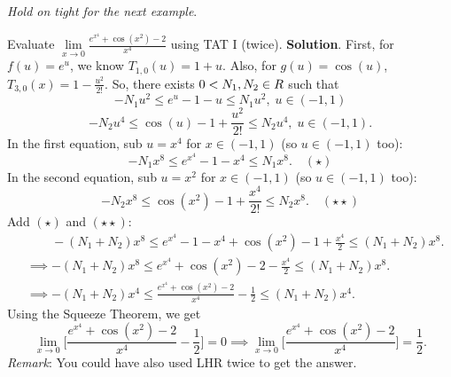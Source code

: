 \emph{Hold on tight for the next example}.
\begin{Example}{}{}
    Evaluate $ \displaystyle \lim\limits_{{x} \to {0}}\frac{e^{x^4}+\cos (x^2)-2}{x^4} $ using TAT I (twice).
    \tcblower{}
    \textbf{Solution}. First, for $ f(u)=e^u $, we know $ T_{1,0}(u)=1+u $. Also, for $ g(u)=\cos(u) $,
    $ T_{3,0}(x)=1-\frac{u^2}{2!} $. So, there exists $ 0<N_1,N_2\in\relax{R} $ such that
    \[ -N_1 u^2\le e^{u}-1-u\le N_1 u^2, \; u\in(-1,1) \]
    \[ -N_2 u^4\le \cos(u)-1+\frac{u^2}{2!}\le N_2 u^4,\; u\in(-1,1). \]
    In the first equation, sub $ u=x^4 $ for $ x\in(-1,1) $ (so $ u\in(-1,1) $ too):
    \[ -N_1 x^8\le e^{x^4}-1-x^4\le N_1 x^8.\quad(\star) \]
    In the second equation, sub $ u=x^2 $ for $ x\in(-1,1) $ (so $ u\in(-1,1) $ too):
    \[ -N_2 x^8\le \cos(x^2)-1+\frac{x^4}{2!}\le N_2 x^8.\quad(\star\star) \]
    Add $ (\star) $ and $ (\star\star) $:
    \begin{align*}
         & \phantom{\implies}-(N_1+N_2)x^8\le e^{x^4}-1-x^4+\cos(x^2)-1+\frac{x^4}{2}\le (N_1+N_2)x^8. \\
         & \implies -(N_1+N_2)x^8\le e^{x^4}+\cos(x^2)-2-\frac{x^4}{2}\le (N_1+N_2)x^8.                \\
         & \implies -(N_1+N_2)x^4\le \frac{e^{x^4}+\cos(x^2)-2}{x^4}-\frac{1}{2}\le (N_1+N_2)x^4.
    \end{align*}
    Using the Squeeze Theorem, we get
    \[ \lim\limits_{{x} \to {0}}\biggl[\frac{e^{x^4}+\cos(x^2)-2}{x^4}-\frac{1}{2}\biggr]=0\implies
        \lim\limits_{{x} \to {0}}\biggl[\frac{e^{x^4}+\cos(x^2)-2}{x^4}\biggr]=\frac{1}{2}. \]
    \emph{Remark}: You could have also used LHR twice to get the answer.
\end{Example}